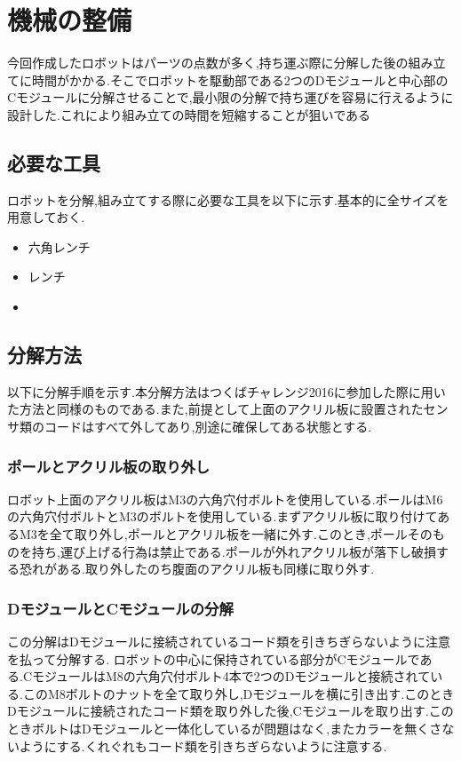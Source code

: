 \section{機械の整備}
今回作成したロボットはパーツの点数が多く,持ち運ぶ際に分解した後の組み立てに時間がかかる.そこでロボットを駆動部である2つのDモジュールと中心部のCモジュールに分解させることで,最小限の分解で持ち運びを容易に行えるように設計した.これにより組み立ての時間を短縮することが狙いである
\subsection{必要な工具}
ロボットを分解,組み立てする際に必要な工具を以下に示す.基本的に全サイズを用意しておく.
\begin{itemize}
 \item 六角レンチ
 \item レンチ
 \item 
\end{itemize}

\subsection{分解方法}
以下に分解手順を示す.本分解方法はつくばチャレンジ2016に参加した際に用いた方法と同様のものである.また,前提として上面のアクリル板に設置されたセンサ類のコードはすべて外してあり,別途に確保してある状態とする.

\subsubsection{ポールとアクリル板の取り外し}
ロボット上面のアクリル板はM3の六角穴付ボルトを使用している.ポールはM6の六角穴付ボルトとM3のボルトを使用している.まずアクリル板に取り付けてあるM3を全て取り外し,ポールとアクリル板を一緒に外す.このとき,ポールそのものを持ち,運び上げる行為は禁止である.ポールが外れアクリル板が落下し破損する恐れがある.取り外したのち腹面のアクリル板も同様に取り外す.
\subsubsection{DモジュールとCモジュールの分解}
この分解はDモジュールに接続されているコード類を引きちぎらないように注意を払って分解する.
ロボットの中心に保持されている部分がCモジュールである.CモジュールはM8の六角穴付ボルト4本で2つのDモジュールと接続されている.このM8ボルトのナットを全て取り外し,Dモジュールを横に引き出す.このときDモジュールに接続されたコード類を取り外した後,Cモジュールを取り出す.このときボルトはDモジュールと一体化しているが問題はなく,またカラーを無くさないようにする.くれぐれもコード類を引きちぎらないように注意する.

